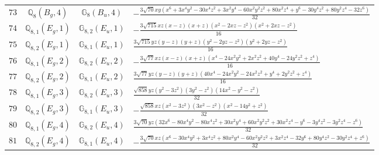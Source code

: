 \documentclass[fleqn,8pt,landscape]{jsarticle}
\begin{document}
\begin{table}[ht!]
\begin{center}
\begin{tabular}{cccl}
$ 73 $ & $ \mathbb{Q}_{8}(B_{g},4) $ & $ \mathbb{G}_{8}(B_{u},4) $ & $ - \frac{3 \sqrt{70} x y \left(x^{6} + 3 x^{4} y^{2} - 30 x^{4} z^{2} + 3 x^{2} y^{4} - 60 x^{2} y^{2} z^{2} + 80 x^{2} z^{4} + y^{6} - 30 y^{4} z^{2} + 80 y^{2} z^{4} - 32 z^{6}\right)}{32} $ \\
$ 74 $ & $ \mathbb{Q}_{8,1}(E_{g},1) $ & $ \mathbb{G}_{8,2}(E_{u},1) $ & $ - \frac{3 \sqrt{715} x z \left(x - z\right) \left(x + z\right) \left(x^{2} - 2 x z - z^{2}\right) \left(x^{2} + 2 x z - z^{2}\right)}{16} $ \\
$ 75 $ & $ \mathbb{Q}_{8,2}(E_{g},1) $ & $ \mathbb{G}_{8,1}(E_{u},1) $ & $ \frac{3 \sqrt{715} y z \left(y - z\right) \left(y + z\right) \left(y^{2} - 2 y z - z^{2}\right) \left(y^{2} + 2 y z - z^{2}\right)}{16} $ \\
$ 76 $ & $ \mathbb{Q}_{8,1}(E_{g},2) $ & $ \mathbb{G}_{8,2}(E_{u},2) $ & $ - \frac{3 \sqrt{77} x z \left(x - z\right) \left(x + z\right) \left(x^{4} - 24 x^{2} y^{2} + 2 x^{2} z^{2} + 40 y^{4} - 24 y^{2} z^{2} + z^{4}\right)}{16} $ \\
$ 77 $ & $ \mathbb{Q}_{8,2}(E_{g},2) $ & $ \mathbb{G}_{8,1}(E_{u},2) $ & $ \frac{3 \sqrt{77} y z \left(y - z\right) \left(y + z\right) \left(40 x^{4} - 24 x^{2} y^{2} - 24 x^{2} z^{2} + y^{4} + 2 y^{2} z^{2} + z^{4}\right)}{16} $ \\
$ 78 $ & $ \mathbb{Q}_{8,1}(E_{g},3) $ & $ \mathbb{G}_{8,2}(E_{u},3) $ & $ \frac{\sqrt{858} y z \left(y^{2} - 3 z^{2}\right) \left(3 y^{2} - z^{2}\right) \left(14 x^{2} - y^{2} - z^{2}\right)}{32} $ \\
$ 79 $ & $ \mathbb{Q}_{8,2}(E_{g},3) $ & $ \mathbb{G}_{8,1}(E_{u},3) $ & $ - \frac{\sqrt{858} x z \left(x^{2} - 3 z^{2}\right) \left(3 x^{2} - z^{2}\right) \left(x^{2} - 14 y^{2} + z^{2}\right)}{32} $ \\
$ 80 $ & $ \mathbb{Q}_{8,1}(E_{g},4) $ & $ \mathbb{G}_{8,2}(E_{u},4) $ & $ \frac{3 \sqrt{70} y z \left(32 x^{6} - 80 x^{4} y^{2} - 80 x^{4} z^{2} + 30 x^{2} y^{4} + 60 x^{2} y^{2} z^{2} + 30 x^{2} z^{4} - y^{6} - 3 y^{4} z^{2} - 3 y^{2} z^{4} - z^{6}\right)}{32} $ \\
$ 81 $ & $ \mathbb{Q}_{8,2}(E_{g},4) $ & $ \mathbb{G}_{8,1}(E_{u},4) $ & $ - \frac{3 \sqrt{70} x z \left(x^{6} - 30 x^{4} y^{2} + 3 x^{4} z^{2} + 80 x^{2} y^{4} - 60 x^{2} y^{2} z^{2} + 3 x^{2} z^{4} - 32 y^{6} + 80 y^{4} z^{2} - 30 y^{2} z^{4} + z^{6}\right)}{32} $ \\
 \hline \hline
\end{tabular}
\end{center}
\end{table}
\end{document}
